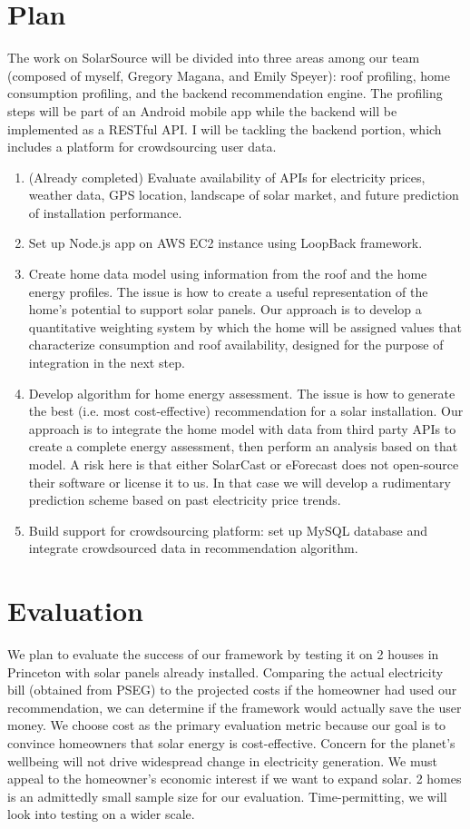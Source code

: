 \documentclass[pageno]{jpaper}
\begin{document}
\section{Plan}
The work on SolarSource will be divided into three areas among our team (composed of myself, Gregory Magana, and Emily Speyer): roof profiling, home consumption profiling, and the backend recommendation engine. The profiling steps will be part of an Android mobile app while the backend will be implemented as a RESTful API. I will be tackling the backend portion, which includes a platform for crowdsourcing user data. \newline
\begin{enumerate}
	\item (Already completed) Evaluate availability of APIs for electricity prices, weather data, GPS location, landscape of solar market, and future prediction of installation performance.
	\item Set up Node.js app on AWS EC2 instance using LoopBack framework.
	\item  Create home data model using information from the roof and the home energy profiles. The issue is how to create a useful representation of the home's potential to support solar panels. Our approach is to develop a quantitative weighting system by which the home will be assigned values that characterize consumption and roof availability, designed for the purpose of integration in the next step.
	\item Develop algorithm for home energy assessment. The issue is how to generate the best (i.e. most cost-effective) recommendation for a solar installation. Our approach is to integrate the home model with data from third party APIs to create a complete energy assessment, then perform an analysis based on that model. A risk here is that either SolarCast or eForecast does not open-source their software or license it to us. In that case we will develop a rudimentary prediction scheme based on past electricity price trends.
	\item Build support for crowdsourcing platform: set up MySQL database and integrate crowdsourced data in recommendation algorithm.
\end{enumerate}

\section{Evaluation}
We plan to evaluate the success of our framework by testing it on 2 houses in Princeton with solar panels already installed. Comparing the actual electricity bill (obtained from PSEG) to the projected costs if the homeowner had used our recommendation, we can determine if the framework would actually save the user money. We choose cost as the primary evaluation metric because our goal is to convince homeowners that solar energy is cost-effective. Concern for the planet's wellbeing will not drive widespread change in electricity generation. We must appeal to the homeowner's economic interest if we want to expand solar. 2 homes is an admittedly small sample size for our evaluation. Time-permitting, we will look into testing on a wider scale.



\end{document}
